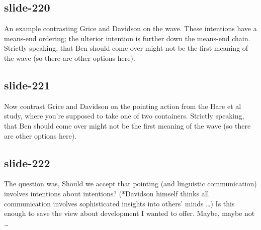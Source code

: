 \documentclass[12pt,\papersize]{extarticle}
\begin{document}
 
\subsection{slide-220}
An example contrasting Grice and Davidson on the wave.
These intentions have a means-end ordering; the ulterior intention is further down the means-end chain.
Strictly speaking, that Ben should come over might not be the first meaning of the wave (so there are other options here).
 
 
\subsection{slide-221}
Now contrast Grice and Davidson on the pointing action from the Hare et al study, where you're supposed to take one of two containers.
Strictly speaking, that Ben should come over might not be the first meaning of the wave (so there are other options here).
 
 
\subsection{slide-222}
The question was, Should we accept that pointing (and linguistic communication) involves intentions about intentions?
(*Davidson himself thinks all communication involves sophisticated insights into others’ minds …)
Is this enough to save the view about development I wanted to offer. Maybe, maybe not …




 






\end{document}
